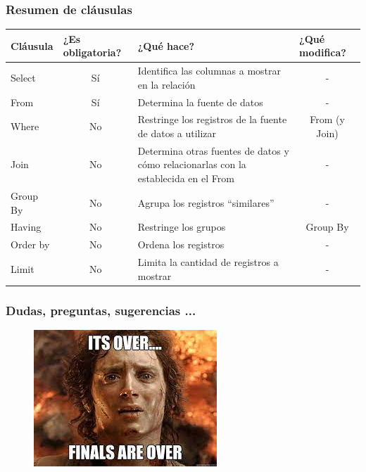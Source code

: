 \documentclass[
	10pt, %
	aspectratio=169, %
]{beamer}
\begin{document}
\begin{frame}
	
	\frametitle{Resumen de cláusulas}

\begin{table}[]
	\begin{tabular}{| l | c | m{6cm} | c |}
		\hline 
		Cláusula & \multicolumn{1}{l|}{¿Es obligatoria?} & ¿Qué hace? & \multicolumn{1}{l|}{¿Qué modifica?} \\ \hline \hline
		Select & Sí & Identifica las columnas a mostrar en la relación & - \\ \hline
		From & Sí & Determina la fuente de datos & - \\ \hline
		Where & No & Restringe los registros de la fuente de datos a utilizar & From (y Join) \\ \hline
		Join & No & Determina otras fuentes de datos y cómo relacionarlas con la establecida en el From & - \\ \hline
		Group By & No & Agrupa los registros ``similares''& - \\ \hline
		Having & No & Restringe los grupos & Group By \\ \hline
		Order by & No & Ordena los registros & - \\ \hline
		Limit & No & Limita la cantidad de registros a mostrar & - \\ \hline
	\end{tabular}
\end{table}




\end{frame}


\begin{frame}
	
	\frametitle{Dudas, preguntas, sugerencias ...}
	
	\begin{figure}[h]
		\centering
		\includegraphics[scale=1.2]{fin.jpeg}
	\end{figure}
	
\end{frame}

\end{document}
